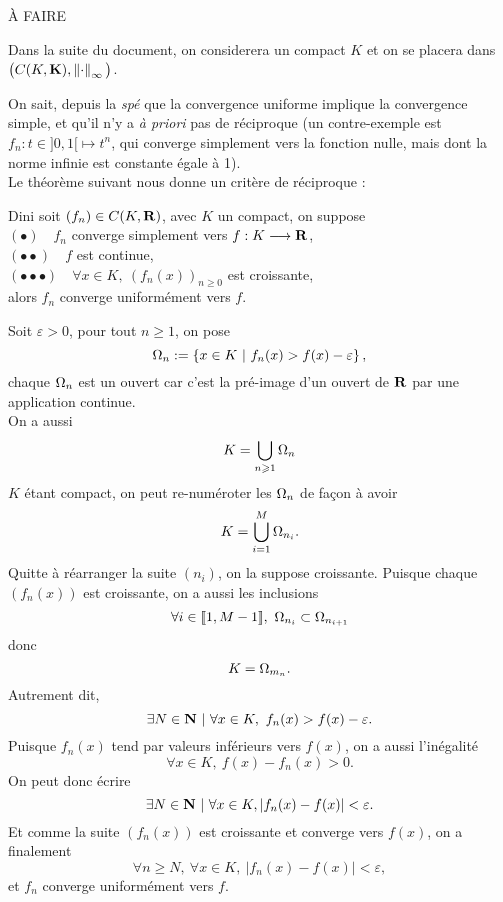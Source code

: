 \documentclass[a4paper,11pt, twoside]{article}
\begin{document}
\begin{Proof}
  À FAIRE
\end{Proof}


Dans la suite du document, on considerera un compact $K$ et on se placera dans $\big(C(K,\mathbf K),\left\lVert\cdot\right\rVert_\infty\big)$.



On sait, depuis la \emph{spé} que la convergence uniforme implique la convergence simple, et qu'il n'y a \emph{à priori} pas de réciproque (un contre-exemple est $f_n :t\in ]0,1[ \longmapsto t^n$, qui converge simplement vers la fonction nulle, mais dont la norme infinie est constante égale à 1).\\
Le théorème suivant nous donne un critère de réciproque :\\


\begin{thC}{Dini}
  soit $\left(f_n\right)\in C(K,\mathbf R)$, avec $K$ un compact, on suppose\\
  $(\bullet)\quad f_n$ converge simplement vers $f:K\longrightarrow\mathbf R$,\\
  $(\bullet\bullet)\quad f$ est continue,\\
  $(\bullet\bullet\bullet)\quad \forall x\in K,\ \left(f_n(x)\right)_{n\geqslant 0}$ est croissante,\\

  alors $f_n$ converge uniformément vers $f$.
\end{thC}


\begin{Proof}
  Soit $\varepsilon >0$, pour tout $n\geqslant 1$, on pose 
  $$\O_n:=\left\{x\in K \ |\ f_n(x)>f(x)-\varepsilon\right\},$$
  chaque $\Omega_n$ est un ouvert car c'est la pré-image d'un ouvert de $\mathbf R$ par une application continue.\\
  On a aussi 
  $$K=\bigcup_{n\geqslant 1}\Omega_n$$
  $K$ étant compact, on peut re-numéroter les $\Omega_n$ de façon à avoir 
  $$K=\bigcup_{i=1}^M\Omega_{n_i}.$$
  Quitte à réarranger la suite $(n_i)$, on la suppose croissante. Puisque chaque $\left(f_n(x)\right)$ est croissante, on a aussi les inclusions 
  $$\forall i\in \llbracket 1,M-1\rrbracket,\ \O_{n_i}\subset\O_{n_{i+1}}$$
  donc 
  $$K=\Omega_{m_n}.$$
  Autrement dit,
  $$\exists N\in\mathbf N \ |\ \forall x\in K,\ f_n(x)> f(x) - \varepsilon.$$
  Puisque $f_n(x)$ tend par valeurs inférieurs vers $f(x)$, on a aussi l'inégalité 
  $$\forall x\in K,\ f(x)-f_n(x)>0.$$
  On peut donc écrire 
  $$\exists N\in\N \ |\ \forall x\in K, |f_n(x) - f(x)| < \varepsilon.$$
  Et comme la suite $\left(f_n(x)\right)$ est croissante et converge vers $f(x)$, on a finalement
  $$\forall n\geqslant N,\ \forall x\in K,\ |f_n(x)-f(x)|< \varepsilon,$$
  et $f_n$ converge uniformément vers $f$.
\end{Proof}
\end{document}
